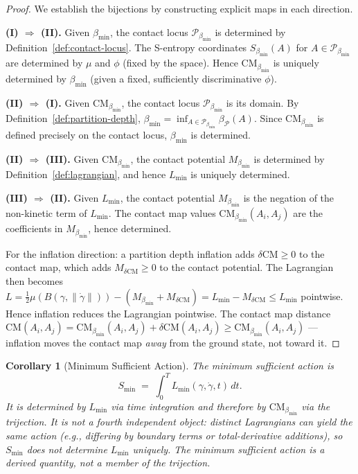 \documentclass[12pt,a4paper,twocolumn]{article}
\theoremstyle{plain}
\newtheorem{corollary}[theorem]{Corollary}
\theoremstyle{definition}
\theoremstyle{remark}
\newcommand{\Part}{\mathcal{P}}
\newcommand{\CM}{\mathrm{CM}}
\newcommand{\bmin}{\beta_{\min}}
\newcommand{\bP}{\beta_{\mathcal{P}}}
\newcommand{\Lmin}{L_{\min}}
\newcommand{\Smin}{S_{\min}}
\newcommand{\CMbmin}{\CM_{\bmin}}
\newcommand{\Sbmin}{S_{\bmin}}
\begin{document}
\begin{proof}
We establish the bijections by constructing explicit maps in each direction.

\textbf{(I) $\Rightarrow$ (II).}  Given $\bmin$, the contact locus
$\Part_{\bmin}$ is determined by Definition~\ref{def:contact-locus}.  The
S-entropy coordinates $\Sbmin(A)$ for $A \in \Part_{\bmin}$ are determined
by $\mu$ and $\phi$ (fixed by the space).  Hence $\CMbmin$ is uniquely
determined by $\bmin$ (given a fixed, sufficiently discriminative $\phi$).

\textbf{(II) $\Rightarrow$ (I).}  Given $\CMbmin$, the contact locus
$\Part_{\bmin}$ is its domain.  By Definition~\ref{def:partition-depth},
$\bmin = \inf_{A \in \Part_{\bmin}} \bP(A)$.  Since $\CMbmin$ is defined
precisely on the contact locus, $\bmin$ is determined.

\textbf{(II) $\Rightarrow$ (III).}  Given $\CMbmin$, the contact potential
$M_{\bmin}$ is determined by Definition~\ref{def:lagrangian}, and hence
$\Lmin$ is uniquely determined.

\textbf{(III) $\Rightarrow$ (II).}  Given $\Lmin$, the contact potential
$M_{\bmin}$ is the negation of the non-kinetic term of $\Lmin$.  The
contact map values $\CMbmin(A_i,A_j)$ are the coefficients in $M_{\bmin}$,
hence determined.

For the inflation direction: a partition depth inflation adds $\delta\CM
\geq 0$ to the contact map, which adds $M_{\delta\CM} \geq 0$ to the
contact potential.  The Lagrangian then becomes
$L = \tfrac{1}{2}\mu(B(\gamma,\|\dot\gamma\|)) - (M_{\bmin} + M_{\delta\CM})
= \Lmin - M_{\delta\CM} \leq \Lmin$ pointwise.  Hence inflation reduces the
Lagrangian pointwise.  The contact map distance $\CM(A_i,A_j) =
\CMbmin(A_i,A_j) + \delta\CM(A_i,A_j) \geq \CMbmin(A_i,A_j)$ --- inflation
moves the contact map \emph{away} from the ground state, not toward it.
\end{proof}

\begin{corollary}[Minimum Sufficient Action]
\label{cor:action}
The \emph{minimum sufficient action} is
\begin{equation}
  \Smin \;=\; \int_0^T \Lmin(\gamma, \dot\gamma, t)\, dt.
\end{equation}
It is determined by $\Lmin$ via time integration and therefore by
$\CMbmin$ via the trijection.  It is \emph{not} a fourth independent
object: distinct Lagrangians can yield the same action (e.g., differing by
boundary terms or total-derivative additions), so $\Smin$ does not determine
$\Lmin$ uniquely.  The minimum sufficient action is a derived quantity, not
a member of the trijection.
\end{corollary}
\end{document}
